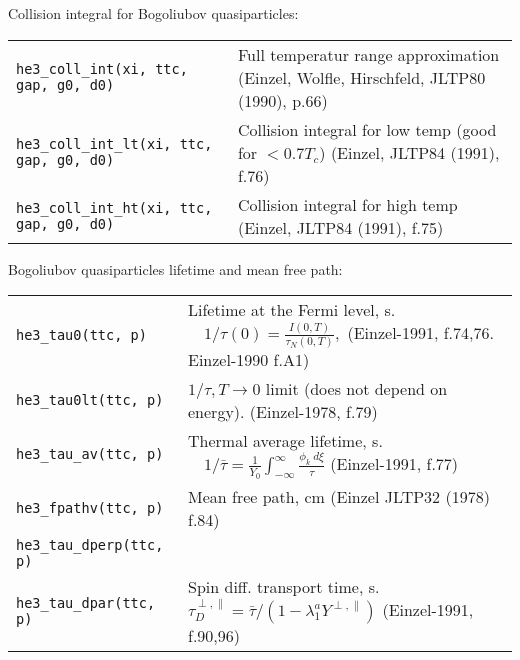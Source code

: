 \documentclass[a4paper]{article}
\begin{document}
\medskip

Collision integral for Bogoliubov quasiparticles:

\medskip
\noindent\begin{tabular}{lp{11cm}}
\tt he3\_coll\_int(xi, ttc, gap, g0, d0) &
   Full temperatur range approximation\newline
   {\small (Einzel, Wolfle, Hirschfeld, JLTP80 (1990), p.66)}\\
\tt he3\_coll\_int\_lt(xi, ttc, gap, g0, d0) &
   Collision integral for low temp (good for $< 0.7 T_c$)\newline
   {\small (Einzel, JLTP84 (1991), f.76)}\\
\tt he3\_coll\_int\_ht(xi, ttc, gap, g0, d0) &
   Collision integral for high temp\newline
   {\small (Einzel, JLTP84 (1991), f.75)}\\
\end{tabular}
\medskip

Bogoliubov quasiparticles lifetime and mean free path:

\medskip
\noindent\begin{tabular}{lp{11cm}}
\tt he3\_tau0(ttc, p)      & Lifetime at the Fermi level, s.
                           $\displaystyle\quad 1/\tau(0) = \frac{I (0,T)}{\tau_N(0,T)},$\newline
                            {\small(Einzel-1991, f.74,76. Einzel-1990 f.A1)}\\

\tt he3\_tau0lt(ttc, p)    & $\displaystyle 1/\tau, T\rightarrow0$ limit (does not depend on energy).
                            {\small(Einzel-1978, f.79)}\\
\tt he3\_tau\_av(ttc, p)   & Thermal average lifetime, s.
                           $\displaystyle\quad 1/\bar\tau = \frac{1}{Y_0}
                           \int_{-\infty}^{\infty} \frac{\phi_k\ d\xi}{\tau}$\newline
                            {\small(Einzel-1991, f.77)}\\
\tt he3\_fpathv(ttc, p)    & Mean free path, cm\newline
                             {\small (Einzel JLTP32 (1978) f.84)}\\

\tt he3\_tau\_dperp(ttc, p) &\\
\tt he3\_tau\_dpar(ttc, p)  & Spin diff. transport time, s.
                           \ $\tau_D^{\perp,\parallel} = \bar\tau
                            /(1-\lambda_1^a Y^{\perp,\parallel})$\newline
                            {\small(Einzel-1991, f.90,96)}\\
\end{tabular}
\medskip
\end{document}
